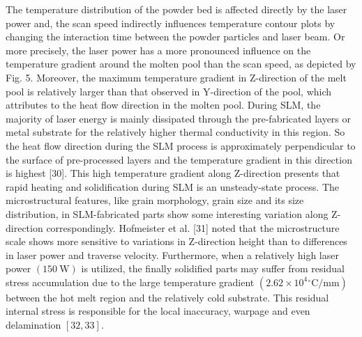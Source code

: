 \documentclass[10pt]{article}
\begin{document}
The temperature distribution of the powder bed is affected directly by the laser power and, the scan speed indirectly influences temperature contour plots by changing the interaction time between the powder particles and laser beam. Or more precisely, the laser power has a more pronounced influence on the temperature gradient around the molten pool than the scan speed, as depicted by Fig. 5. Moreover, the maximum temperature gradient in Z-direction of the melt pool is relatively larger than that observed in Y-direction of the pool, which attributes to the heat flow direction in the molten pool. During SLM, the majority of laser energy is mainly dissipated through the pre-fabricated layers or metal substrate for the relatively higher thermal conductivity in this region. So the heat flow direction during the SLM process is approximately perpendicular to the surface of pre-processed layers and the temperature gradient in this direction is highest [30]. This high temperature gradient along Z-direction presents that rapid heating and solidification during SLM is an unsteady-state process. The microstructural features, like grain morphology, grain size and its size distribution, in SLM-fabricated parts show some interesting variation along Z-direction correspondingly. Hofmeister et al. [31] noted that the microstructure scale shows more sensitive to variations in Z-direction height than to differences in laser power and traverse velocity. Furthermore, when a relatively high laser power $(150 \mathrm{~W})$ is utilized, the finally solidified parts may suffer from residual stress accumulation due to the large temperature gradient $\left(2.62 \times 10^{4}{ }^{\circ} \mathrm{C} / \mathrm{mm}\right)$ between the hot melt region and the relatively cold substrate. This residual internal stress is responsible for the local inaccuracy, warpage and even delamination $[32,33]$.
\end{document}
